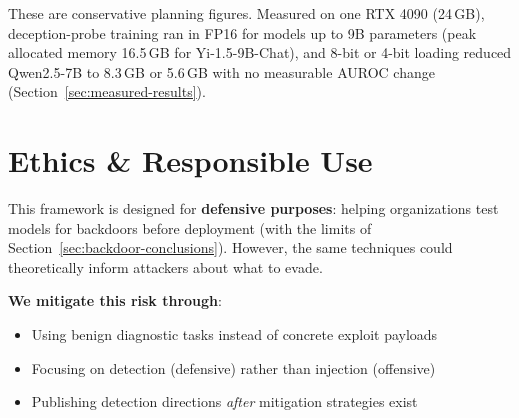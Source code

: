 \documentclass[11pt,letterpaper]{article}
\begin{document}
These are conservative planning figures. Measured on one RTX 4090 (24\,GB), deception-probe training ran in FP16 for models up to 9B parameters (peak allocated memory 16.5\,GB for Yi-1.5-9B-Chat), and 8-bit or 4-bit loading reduced Qwen2.5-7B to 8.3\,GB or 5.6\,GB with no measurable AUROC change (Section~\ref{sec:measured-results}).

\section{Ethics \& Responsible Use}
\label{sec:ethics}

\begin{warningbox}
This framework is designed for \textbf{defensive purposes}: helping organizations test models for backdoors before deployment (with the limits of Section~\ref{sec:backdoor-conclusions}). However, the same techniques could theoretically inform attackers about what to evade.

\textbf{We mitigate this risk through}:
\begin{itemize}[nosep]
  \item Using benign diagnostic tasks instead of concrete exploit payloads
  \item Focusing on detection (defensive) rather than injection (offensive)
  \item Publishing detection directions \textit{after} mitigation strategies exist
\end{itemize}
\end{warningbox}
\end{document}

